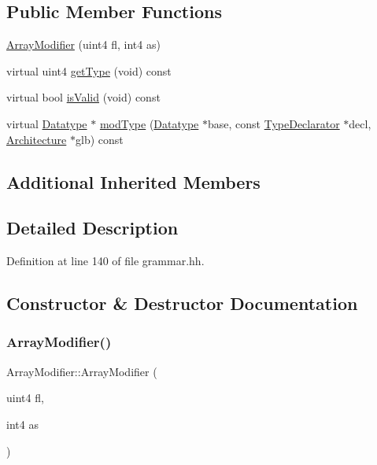 \subsection*{Public Member Functions}
\begin{DoxyCompactItemize}
\item 
\mbox{\hyperlink{class_array_modifier_ae986cf164adf9b421b3a9c4b6d2d4108}{Array\+Modifier}} (uint4 fl, int4 as)
\item 
virtual uint4 \mbox{\hyperlink{class_array_modifier_afdececd05d0f382f08e4c5502d8ba17c}{get\+Type}} (void) const
\item 
virtual bool \mbox{\hyperlink{class_array_modifier_ac9ad18fe0ecb33f70808ba1ca8acd574}{is\+Valid}} (void) const
\item 
virtual \mbox{\hyperlink{class_datatype}{Datatype}} $\ast$ \mbox{\hyperlink{class_array_modifier_a6e94c75eabef7320f99e2817ea62fc00}{mod\+Type}} (\mbox{\hyperlink{class_datatype}{Datatype}} $\ast$base, const \mbox{\hyperlink{class_type_declarator}{Type\+Declarator}} $\ast$decl, \mbox{\hyperlink{class_architecture}{Architecture}} $\ast$glb) const
\end{DoxyCompactItemize}
\subsection*{Additional Inherited Members}


\subsection{Detailed Description}


Definition at line 140 of file grammar.\+hh.



\subsection{Constructor \& Destructor Documentation}
\mbox{\label{class_array_modifier_ae986cf164adf9b421b3a9c4b6d2d4108}} 
\subsubsection{\texorpdfstring{ArrayModifier()}{ArrayModifier()}}
{\footnotesize\ttfamily Array\+Modifier\+::\+Array\+Modifier (\begin{DoxyParamCaption}\item[{uint4}]{fl,  }\item[{int4}]{as }\end{DoxyParamCaption})\hspace{0.3cm}{\ttfamily [inline]}}



